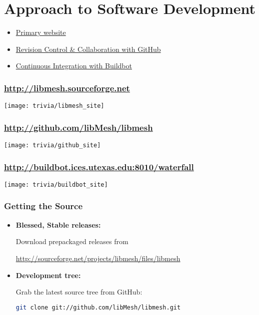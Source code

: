 \section{Approach to Software Development}
\frame
{
  \Large
  \begin{block}{}
    \begin{itemize}
      \item \href{http://libmesh.sourceforge.net}{Primary website}
      \item \href{http://github.com/libMesh/libmesh}{Revision Control \& Collaboration with GitHub}
      \item \href{http://buildbot.ices.utexas.edu:8010/waterfall}{Continuous Integration with Buildbot}
    \end{itemize}
  \end{block}
}


\frame
{
\frametitle{\url{http://libmesh.sourceforge.net}}

\centerline{\texttt{[image: trivia/libmesh\_site]}}
}


\frame
{
\frametitle{\url{http://github.com/libMesh/libmesh}}

\centerline{\texttt{[image: trivia/github\_site]}}
}


\frame
{
\frametitle{\scriptsize \url{http://buildbot.ices.utexas.edu:8010/waterfall}}

\centerline{\texttt{[image: trivia/buildbot\_site]}}
}


\begin{frame}[fragile]
  \frametitle{Getting the \libMesh{} Source}

  \begin{block}{}
    \begin{itemize}
    \item \textbf{Blessed, Stable releases:}

      Download prepackaged releases from

      \scriptsize{\url{http://sourceforge.net/projects/libmesh/files/libmesh}}
      \normalsize
    \item \textbf{Development tree:}

      Grab the latest source tree from GitHub:
      \begin{lstlisting}[language=bash]
        git clone git://github.com/libMesh/libmesh.git
      \end{lstlisting}
    \end{itemize}
  \end{block}
\end{frame}


